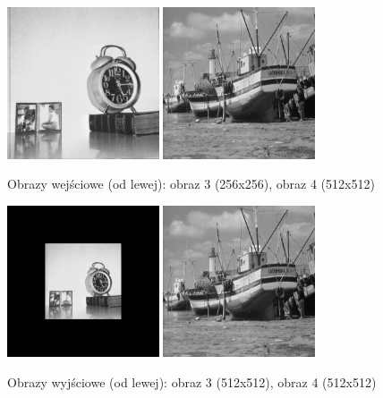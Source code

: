 \documentclass[final,a4paper,openany,12pt]{mwbk}
\begin{document}
\begin{figure}[H]
	\begin{center}
		\includegraphics[width=0.4\textwidth]{clock_gray}
		\includegraphics[width=0.4\textwidth]{boat_gray}
	\end{center}
	\caption{Obrazy wejściowe (od lewej): obraz 3 (256x256), obraz 4 (512x512)}
\end{figure}

\begin{figure}[H]
	\begin{center}
		\includegraphics[width=0.4\textwidth]{clock_gray_unificationGeo_result}
		\includegraphics[width=0.4\textwidth]{boat_gray_unificationGeo_result}
	\end{center}
	\caption{Obrazy wyjściowe (od lewej): obraz 3 (512x512), obraz 4 (512x512)}
\end{figure}
\end{document}
